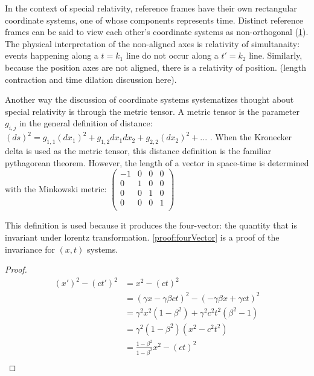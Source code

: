 \documentclass{article}
\begin{document}
In the context of special relativity, reference frames have their own rectangular coordinate systems, one of whose components represents time. Distinct reference frames can be said to view each other's coordinate systems as non-orthogonal (\cref{fig:axes}). The physical interpretation of the non-aligned axes is relativity of simultanaity: events happening along a $t=k_1$ line do not occur along a $t'=k_2$ line. Similarly, because the position axes are not aligned, there is a relativity of position. (length contraction and time dilation discussion here).

Another way the discussion of coordinate systems systematizes thought about special relativity is through the metric tensor. A metric tensor is the parameter $g_{i,j}$ in the general definition of distance: $ (ds)^2 = g_{1,1} (dx_1)^2 + g_{1,2} dx_1 dx_2 + g_{2,2} (dx_2)^2 + ...$ \cite{mathworld}. When the Kronecker delta is used as the metric tensor, this distance definition is the familiar pythagorean theorem. However, the length of a vector in space-time is determined with the Minkowski metric:
$\begin{pmatrix}
-1 & 0 & 0 & 0 \\
0 & 1 & 0 & 0 \\
0 & 0 & 1 & 0 \\
0 & 0 & 0 & 1 \\
\end{pmatrix}$

This definition is used because it produces the four-vector: the quantity that is invariant under lorentz transformation. \cref{proof:fourVector} is a proof of the invariance for $(x,t)$ systems.

\begin{proof}
\begin{align*}
(x')^2 - (c t')^2 &= x^2 - (c t)^2 \\
&= (\gamma x - \gamma \beta c t)^2 - (- \gamma \beta x + \gamma c t)^2  \\
&= \gamma^2 x^2 (1 - \beta^2) + \gamma^2 c^2 t^2 (\beta^2 - 1) \\
&= \gamma^2 (1 - \beta^2) (x^2 - c^2 t^2) \\
&= \frac{1 - \beta^2}{1 - \beta^2} x^2 - (c t)^2 \\
\end{align*}
\label{proof:fourVector}
\end{proof}

\begin{figure}
\caption{}
\label{fig:axes}
\end{figure}
\end{document}
